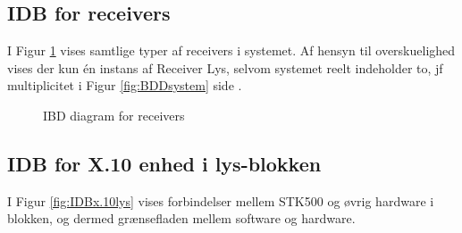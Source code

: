 \clearpage

\begin{landscape}
\subsection{IDB for receivers}

I Figur \ref{fig:IDBreceivers} vises samtlige typer af receivers i systemet. Af hensyn til overskuelighed vises der kun én instans af Receiver Lys, selvom systemet reelt indeholder to, jf multiplicitet i Figur \ref{fig:BDDsystem} side \pageref{fig:BDDsystem}.

\begin{figure}[h]
	\centering {}
	\caption{IBD diagram for receivers}
	\label{fig:IDBreceivers}
\end{figure}
\end{landscape}

\clearpage

\subsection{IDB for X.10 enhed i lys-blokken} \label{subsec:IBDX10Lys}

I Figur \ref{fig:IDBx.10lys} vises forbindelser mellem STK500 og øvrig hardware i blokken, og dermed grænsefladen mellem software og hardware.

